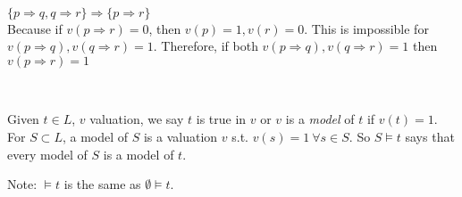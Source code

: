 ~\\
\begin{example}
$\{p \Rightarrow q, q \Rightarrow r \} \Rightarrow \{p \Rightarrow r \}$\\
Because if $v(p \Rightarrow r)=0$, then $v(p)=1, v(r)=0$.
This is impossible for $v(p \Rightarrow q), v(q \Rightarrow r)=1$.
Therefore, if both $v(p \Rightarrow q), v(q \Rightarrow r)=1$ then
$v(p \Rightarrow r)=1$
\end{example}
~\\
\begin{definition}
Given $t \in L$, $v$ valuation, we say $t$ is true in $v$ or $v$ is
a \emph{model} of $t$ if $v(t)=1$. For $S \subset L$, a model of $S$
is a valuation $v$ s.t. $v(s)=1 ~\forall s \in S$.
So $S \models t$ says that every model of $S$ is a model of $t$.\\
\end{definition}
Note: $\models t$ is the same as $\emptyset \models t$.\\
